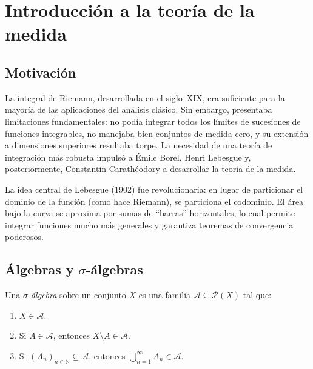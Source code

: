 \chapter{Introducción a la teoría de la medida}
\label{ch:teoria-medida}

\section{Motivación}

La integral de Riemann, desarrollada en el siglo~XIX, era suficiente para la mayoría de las aplicaciones del análisis clásico. Sin embargo, presentaba limitaciones fundamentales: no podía integrar todos los límites de sucesiones de funciones integrables, no manejaba bien conjuntos de medida cero, y su extensión a dimensiones superiores resultaba torpe. La necesidad de una teoría de integración más robusta impulsó a Émile Borel, Henri Lebesgue y, posteriormente, Constantin Carathéodory a desarrollar la teoría de la medida.

La idea central de Lebesgue (1902) fue revolucionaria: en lugar de particionar el dominio de la función (como hace Riemann), se particiona el codominio. El área bajo la curva se aproxima por sumas de ``barras'' horizontales, lo cual permite integrar funciones mucho más generales y garantiza teoremas de convergencia poderosos.

\section{Álgebras y \texorpdfstring{$\sigma$}{sigma}-álgebras}

\begin{definition}
\label{def:sigma-algebra}
Una \emph{$\sigma$-álgebra} sobre un conjunto $X$ es una familia $\mathcal{A}\subseteq\mathcal{P}(X)$ tal que:
\begin{enumerate}
  \item[(i)] $X\in\mathcal{A}$.
  \item[(ii)] Si $A\in\mathcal{A}$, entonces $X\setminus A\in\mathcal{A}$.
  \item[(iii)] Si $(A_n)_{n\in\mathbb{N}}\subseteq\mathcal{A}$, entonces $\bigcup_{n=1}^{\infty}A_n\in\mathcal{A}$.
\end{enumerate}
\end{definition}

